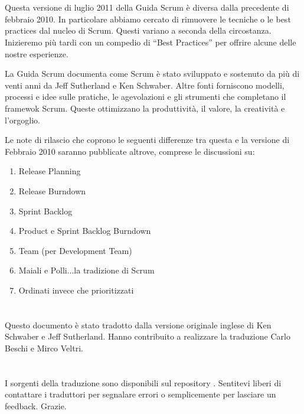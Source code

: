\newpage
\section*{\color{Blue}{Revisioni}}
\label{sec:revisions}
Questa versione di luglio 2011 della Guida Scrum è diversa dalla precedente di febbraio 2010. In particolare abbiamo cercato di rimuovere le tecniche o le best practices dal nucleo di Scrum. Questi variano a seconda della circostanza. Inizieremo pi\`u tardi con un compedio di ``Best Practices'' per offrire alcune delle nostre esperienze.

La Guida Scrum documenta come Scrum \`e stato sviluppato e sostenuto da pi\`u di venti anni da Jeff Sutherland e Ken Schwaber. Altre fonti forniscono modelli, processi e idee sulle pratiche, le agevolazioni e gli strumenti che completano il framewok Scrum. Queste ottimizzano la produttività, il valore, la creatività e l'orgoglio.

Le note di rilascio che coprono le seguenti differenze tra questa e la versione di Febbraio 2010 saranno pubblicate altrove, comprese le discussioni su:

\begin{enumerate}
 	\item Release Planning
	\item Release Burndown
	\item Sprint Backlog
	\item Product e Sprint Backlog Burndown
	\item Team (per Development Team)
	\item Maiali e Polli...la tradizione di Scrum
	\item Ordinati invece che prioritizzati 
\end{enumerate}

\newpage
\section*{\color{Blue}{Traduzione}}
\label{sec:translation}
Questo documento \`e stato tradotto dalla versione originale inglese di Ken Schwaber e Jeff Sutherland. Hanno contribuito a realizzare la traduzione Carlo Beschi e Mirco Veltri.

\section*{\color{Blue}{Note alla versione italiana}}
\label{sec:transnotes}
I sorgenti della traduzione sono disponibili sul repository . 
Sentitevi liberi di contattare i traduttori per segnalare errori o semplicemente per lasciare un feedback. Grazie.
